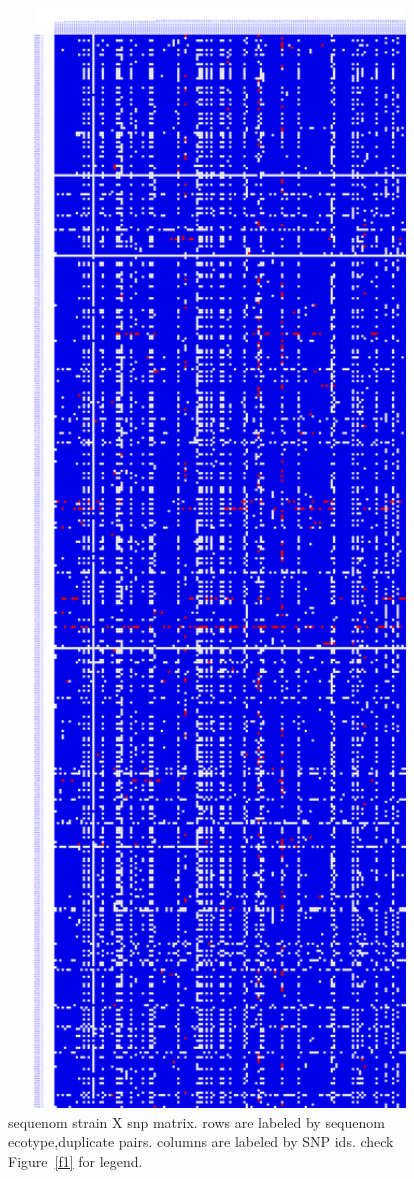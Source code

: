 \documentclass[a3paper,10pt]{article}
\begin{document}
\begin{figure}
\includegraphics[width=1\textwidth, height=1\textheight]{figures/sequenom_with_strains_matched_to_2010pcr_accession2ecotype_complete_y3.png}
\caption{sequenom strain X snp matrix. rows are labeled by sequenom ecotype,duplicate pairs. columns are labeled by SNP ids. check Figure~\ref{f1} for legend.}\label{f3}
\end{figure}
\end{document}
